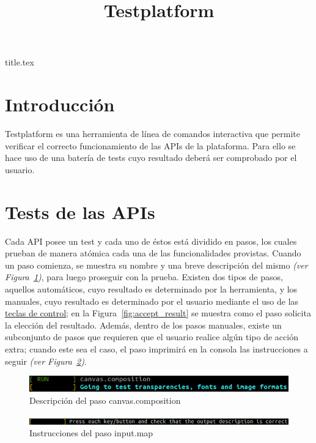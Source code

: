 \documentclass{article}
\begin{document}
\title{Testplatform}
{title.tex}
\tableofcontents
\pagebreak

\section{Introducción}
Testplatform es una herramienta de línea de comandos interactiva que permite verificar el correcto funcionamiento de las APIs de la plataforma. Para ello se hace uso de una batería de tests cuyo resultado deberá ser comprobado por el usuario.

\FloatBarrier

\section{Tests de las APIs}
Cada API posee un test y cada uno de éstos está dividido en pasos, los cuales prueban de manera atómica cada una de las funcionalidades provistas. Cuando un paso comienza, se muestra su nombre y una breve descripción del mismo \textit{(ver Figura~\ref{fig:test_description})}, para luego proseguir con la prueba. Existen dos tipos de pasos, aquellos automáticos, cuyo resultado es determinado por la herramienta, y los manuales, cuyo resultado es determinado por el usuario mediante el uso de las \hyperref[sec:control_keys]{teclas de control}; en la Figura~\ref{fig:accept_result} se muestra como el paso solicita la elección del resultado. Además, dentro de los pasos manuales, existe un subconjunto de pasos que requieren que el usuario realice algún tipo de acción extra; cuando este sea el caso, el paso imprimirá en la consola las instrucciones a seguir \textit{(ver Figura~\ref{fig:test_instructions})}.

\begin{figure}[h]
\centering
\includegraphics[scale=0.50]{testdescription}
\caption{Descripción del paso canvas.composition}
\label{fig:test_description}
\end{figure}

\begin{figure}[h]
\centering
\includegraphics[scale=0.50]{testinstructions}
\caption{Instrucciones del paso input.map}
\label{fig:test_instructions}
\end{figure}
\end{document}

